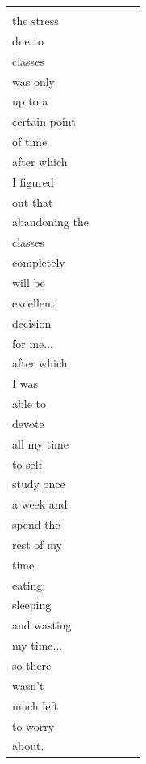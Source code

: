 \documentclass[11pt]{scrartcl}
\begin{document}
\begin{longtable}[c]{|l|l|l|l|l|}
		\begin{tabular}[c]{@{}l@{}}For me, \\ the stress \\ due to \\ classes \\ was only   \\ up to a \\ certain point \\ of time \\ after which \\ I figured \\ out that \\ abandoning the   \\ classes \\ completely \\ will be \\ excellent \\ decision \\ for me...\\ after which \\ I was   \\ able to \\ devote \\ all my time \\ to self \\ study once \\ a week and \\ spend the \\ rest of my   \\ time \\ eating,\\  sleeping \\ and wasting \\ my time...\\ so there \\ wasn't \\ much left \\ to worry \\ about.\end{tabular} &

\end{longtable}
\end{document}
